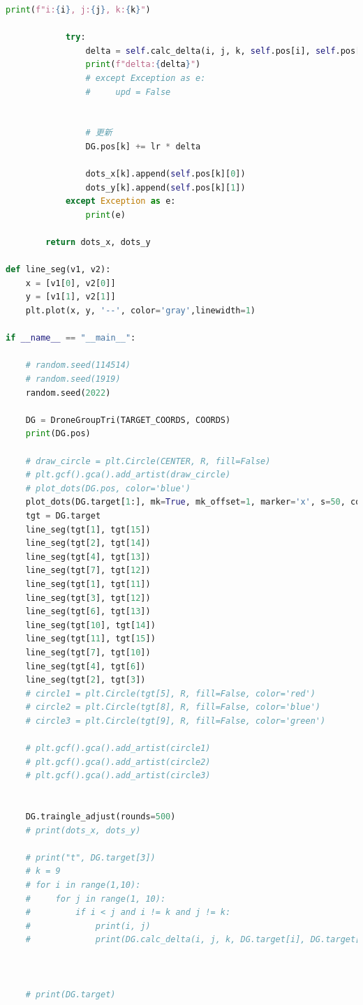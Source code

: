 \documentclass[withoutpreface,bwprint]{cumcmthesis} %
\begin{document}
\begin{appendices}
\begin{lstlisting}[language=python]
            print(f"i:{i}, j:{j}, k:{k}")
            
            try:
                delta = self.calc_delta(i, j, k, self.pos[i], self.pos[j], ref0=self.pos[center], mapping=mapping, debug=True)
                print(f"delta:{delta}")
                # except Exception as e:
                #     upd = False


                # 更新
                DG.pos[k] += lr * delta

                dots_x[k].append(self.pos[k][0])
                dots_y[k].append(self.pos[k][1])
            except Exception as e:
                print(e)
                
        return dots_x, dots_y

def line_seg(v1, v2):
    x = [v1[0], v2[0]]
    y = [v1[1], v2[1]]
    plt.plot(x, y, '--', color='gray',linewidth=1)

if __name__ == "__main__":
    
    # random.seed(114514)
    # random.seed(1919)
    random.seed(2022)
    
    DG = DroneGroupTri(TARGET_COORDS, COORDS)
    print(DG.pos)
    
    # draw_circle = plt.Circle(CENTER, R, fill=False)
    # plt.gcf().gca().add_artist(draw_circle)
    # plot_dots(DG.pos, color='blue')
    plot_dots(DG.target[1:], mk=True, mk_offset=1, marker='x', s=50, color='red', label="调整目标")
    tgt = DG.target
    line_seg(tgt[1], tgt[15])
    line_seg(tgt[2], tgt[14])
    line_seg(tgt[4], tgt[13])
    line_seg(tgt[7], tgt[12])
    line_seg(tgt[1], tgt[11])
    line_seg(tgt[3], tgt[12])
    line_seg(tgt[6], tgt[13])
    line_seg(tgt[10], tgt[14])
    line_seg(tgt[11], tgt[15])
    line_seg(tgt[7], tgt[10])
    line_seg(tgt[4], tgt[6])
    line_seg(tgt[2], tgt[3])
    # circle1 = plt.Circle(tgt[5], R, fill=False, color='red')
    # circle2 = plt.Circle(tgt[8], R, fill=False, color='blue')
    # circle3 = plt.Circle(tgt[9], R, fill=False, color='green')
    
    # plt.gcf().gca().add_artist(circle1)
    # plt.gcf().gca().add_artist(circle2)
    # plt.gcf().gca().add_artist(circle3)
    
    
    DG.traingle_adjust(rounds=500)
    # print(dots_x, dots_y)
    
    # print("t", DG.target[3])
    # k = 9
    # for i in range(1,10):
    #     for j in range(1, 10):
    #         if i < j and i != k and j != k: 
    #             print(i, j)
    #             print(DG.calc_delta(i, j, k, DG.target[i], DG.target[j],debug=True))
    
    
    
    # print(DG.target)
 \end{lstlisting}

\end{appendices}
\end{document}
